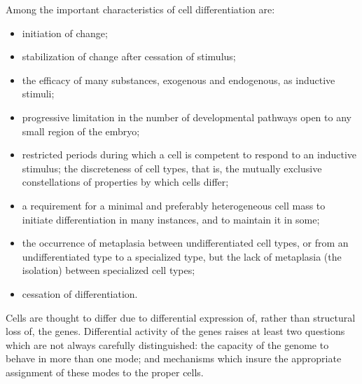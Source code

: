 Among the important characteristics of cell differentiation are: 
\begin{itemize}
\item initiation
of change; 
\item stabilization of change after cessation of stimulus; 
\item the efficacy of
many substances, exogenous and endogenous, as inductive stimuli;
\item progressive limitation in the number of developmental pathways open to any small region of the embryo; 
\item restricted periods during which
a cell is competent to respond to an inductive stimulus; the discreteness of
cell types, that is, the mutually exclusive constellations of properties by
which cells differ; 
\item a requirement for a minimal and preferably heterogeneous
cell mass to initiate differentiation in many instances, and to maintain it in
some; 
\item the occurrence of metaplasia between undifferentiated cell types, or
from an undifferentiated type to a specialized type, but the lack of metaplasia
(the isolation) between specialized cell types; 
\item cessation of differentiation.
\end{itemize}

Cells are thought to differ due to differential expression of, rather than
structural loss of, the genes. Differential activity of the genes raises at least
two questions which are not always carefully distinguished: the capacity of
the genome to behave in more than one mode; and mechanisms which insure
the appropriate assignment of these modes to the proper cells.



